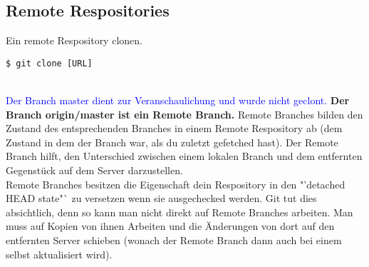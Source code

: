 \documentclass[a4paper,8pt,landscape,twocolumn]{scrartcl}
\begin{document}
\subsection{Remote Respositories}
\begin{orangeBox}
Ein remote Respository clonen.
\begin{lstlisting}[style=bash]
$ git clone [URL]
\end{lstlisting}

\\
\textcolor{blue}{Der Branch master dient zur Veranschaulichung und wurde nicht geclont.} \textbf{Der Branch origin/master ist ein Remote Branch.} Remote Branches bilden den Zustand des entsprechenden Branches in einem Remote Respository ab (dem Zustand in dem der Branch war, als du zuletzt gefetched hast). Der Remote Branch hilft, den Unterschied zwischen einem lokalen Branch und dem entfernten Gegenstück auf dem Server darzustellen.\\
Remote Branches besitzen die Eigenschaft dein Respository in den "'detached HEAD state"` zu versetzen wenn sie ausgechecked werden. Git tut dies absichtlich, denn so kann man nicht direkt auf Remote Branches arbeiten. Man muss auf Kopien von ihnen Arbeiten und die Änderungen von dort auf den entfernten Server schieben (wonach der Remote Branch dann auch bei einem selbst aktualisiert wird).
\end{orangeBox}
\end{document}
